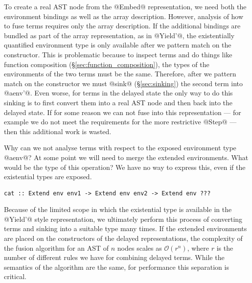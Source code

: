 To create a real AST node from the @Embed@ representation, we need both the
environment bindings as well as the array description. However, analysis of how
to fuse terms requires only the array description. If the additional bindings
are bundled as part of the array representation, as in @Yield'@, the
existentially quantified environment type is only available after we pattern
match on the constructor. This is problematic because to inspect terms and do
things like function composition (\S\ref{sec:function_composition}), the types of
the environments of the two terms must be the same. Therefore, after we pattern
match on the constructor we must @sink@ (\S\ref{sec:sinking}) the second term
into @aenv'@. Even worse, for terms in the delayed state the only way to do this
sinking is to first convert them into a real AST node and then back into the
delayed state. If for some reason we can not fuse into this representation ---
for example we do not meet the requirements for the more restrictive @Step@ ---
then this additional work is wasted.

Why can we not analyse terms with respect to the exposed environment type
@aenv@? At some point we will need to merge the extended environments. What
would be the type of this operation? We have no way to express this, even if the
existential types are exposed.
%
\begin{lstlisting}[style=haskell]
cat :: Extend env env1 -> Extend env env2 -> Extend env ???
\end{lstlisting}

Because of the limited scope in which the existential type is available in the
@Yield'@ style representation, we ultimately perform this process of converting
terms and sinking into a suitable type many times. If the extended environments
are placed on the constructors of the delayed representations, the complexity of
the fusion algorithm for an AST of $n$ nodes scales as $\mathcal{O}(r^n)$, where
$r$ is the number of different rules we have for combining delayed terms. While
the semantics of the algorithm are the same, for performance this separation is
critical.

